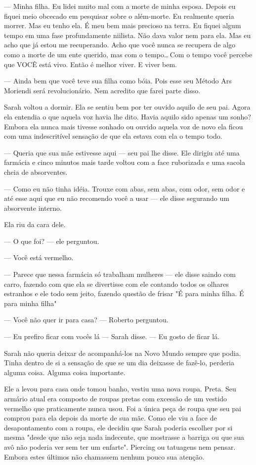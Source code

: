 --- Minha filha. Eu lidei muito mal com a morte de minha esposa. Depois eu fiquei meio obcecado em pesquisar sobre o além-morte. Eu realmente queria morrer. Mas eu tenho ela. É meu bem mais precioso na terra. Eu fiquei algum tempo em uma fase profundamente niilista. Não dava valor nem para ela. Mas eu acho que já estou me recuperando. Acho que você nunca se recupera de algo como a morte de um ente querido, mas com o tempo\ldots\,Com o tempo você percebe que VOCÊ está vivo. Então é melhor viver. E viver bem.

--- Ainda bem que você teve sua filha como bóia. Pois esse seu Método Ars Moriendi será revolucionário. Nem acredito que farei parte disso.

Sarah voltou a dormir. Ela se sentiu bem por ter ouvido aquilo de seu pai. Agora ela entendia o que aquela voz havia lhe dito. Havia aquilo sido apenas um sonho? Embora ela nunca mais tivesse sonhado ou ouvido aquela voz de novo ela ficou com uma indescritível sensação de que ela estava com ela o tempo todo.

--- Queria que sua mãe estivesse aqui --- seu pai lhe disse. Ele dirigiu até uma farmácia e cinco minutos mais tarde voltou com a face ruborizada e uma sacola cheia de absorventes.

--- Como eu não tinha idéia. Trouxe com abas, sem abas, com odor, sem odor e até esse aqui que eu não recomendo você a usar --- ele disse segurando um absorvente interno.

Ela riu da cara dele.

--- O que foi? --- ele perguntou.

--- Você está vermelho.

--- Parece que nessa farmácia só trabalham mulheres ---  ele disse saindo com carro, fazendo com que ela se divertisse com ele contando todos os olhares estranhos e ele todo sem jeito, fazendo questão de frisar "É para minha filha. É para minha filha"

--- Você não quer ir para casa? --- Roberto perguntou.

--- Eu prefiro ficar com vocês lá --- Sarah disse. --- Eu gosto de ficar lá.

Sarah não queria deixar de acompanhá-los na Novo Mundo sempre que podia. Tinha dentro de si a sensação de que se um dia deixasse de fazê-lo, perderia alguma coisa. Alguma coisa importante.

Ele a levou para casa onde tomou banho, vestiu uma nova roupa. Preta. Seu armário atual era composto de roupas pretas com excessão de um vestido vermelho que praticamente nunca usou. Foi a única peça de roupa que seu pai comprou para ela depois da morte de sua mãe. Como ele viu a face de desapontamento com a roupa, ele decidiu que Sarah poderia escolher por si mesma "desde que não seja nada indecente, que mostrasse a barriga ou que sua avô não poderia ver sem ter um enfarte". Piercing ou tatuagens nem pensar. Embora estes últimos não chamassem nenhum pouco sua atenção.


